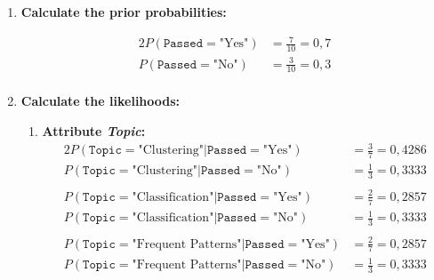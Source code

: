 \documentclass[
english,
smallborders
]{i6prcsht}
\newcommand{\PriorProbability}[2]{P(\texttt{#1}=\text{"#2"})}
\newcommand{\Likelihood}[4]{P(\texttt{#1}=\text{"#2"} | \texttt{#3}=\text{"#4"})}
\begin{document}
\begin{solution}
	\begin{enumerate}
		\item \textbf{Calculate the prior probabilities:}

		      \begin{alignat*}{2}
			      \PriorProbability{Passed}{Yes} & = \frac{7}{10} = 0,7 \\
			      \PriorProbability{Passed}{No}  & = \frac{3}{10} = 0,3 \\
		      \end{alignat*}

		\item \textbf{Calculate the likelihoods:}

		      \begin{enumerate}
			      \item \textbf{Attribute \textit{Topic}:}
			            \begin{alignat*}{2}
				            \Likelihood{Topic}{Clustering}{Passed}{Yes}        & = \frac{3}{7} = 0,4286 \\
				            \Likelihood{Topic}{Clustering}{Passed}{No}         & = \frac{1}{3} = 0,3333 \\
				                                                               &                        \\
				            \Likelihood{Topic}{Classification}{Passed}{Yes}    & = \frac{2}{7} = 0,2857 \\
				            \Likelihood{Topic}{Classification}{Passed}{No}     & = \frac{1}{3} = 0,3333 \\
				                                                               &                        \\
				            \Likelihood{Topic}{Frequent Patterns}{Passed}{Yes} & = \frac{2}{7} = 0,2857 \\
				            \Likelihood{Topic}{Frequent Patterns}{Passed}{No}  & = \frac{1}{3} = 0,3333 \\
			            \end{alignat*}


\end{enumerate}
\end{enumerate}
\end{solution}
\end{document}
